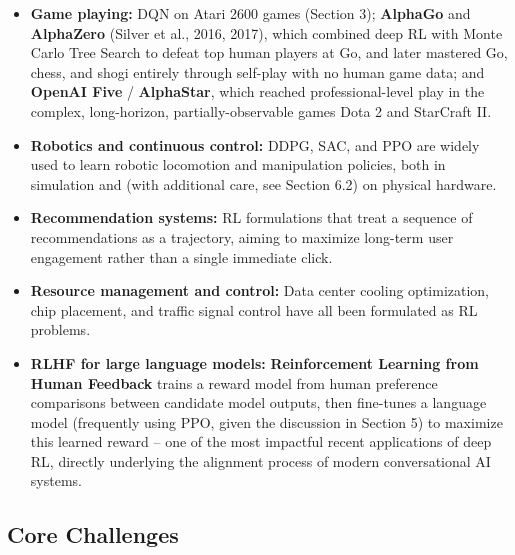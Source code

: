 \documentclass[12pt,a4paper]{article}
\begin{document}
\begin{itemize}[leftmargin=1.5em]
    \item \textbf{Game playing:} DQN on Atari 2600 games (Section 3); \textbf{AlphaGo} and \textbf{AlphaZero} (Silver et al., 2016, 2017), which combined deep RL with Monte Carlo Tree Search to defeat top human players at Go, and later mastered Go, chess, and shogi entirely through self-play with no human game data; and \textbf{OpenAI Five} / \textbf{AlphaStar}, which reached professional-level play in the complex, long-horizon, partially-observable games Dota 2 and StarCraft II.
    \item \textbf{Robotics and continuous control:} DDPG, SAC, and PPO are widely used to learn robotic locomotion and manipulation policies, both in simulation and (with additional care, see Section 6.2) on physical hardware.
    \item \textbf{Recommendation systems:} RL formulations that treat a sequence of recommendations as a trajectory, aiming to maximize long-term user engagement rather than a single immediate click.
    \item \textbf{Resource management and control:} Data center cooling optimization, chip placement, and traffic signal control have all been formulated as RL problems.
    \item \textbf{RLHF for large language models:} \textbf{Reinforcement Learning from Human Feedback} trains a reward model from human preference comparisons between candidate model outputs, then fine-tunes a language model (frequently using PPO, given the discussion in Section 5) to maximize this learned reward -- one of the most impactful recent applications of deep RL, directly underlying the alignment process of modern conversational AI systems.
\end{itemize}

\subsection{Core Challenges}
\end{document}
